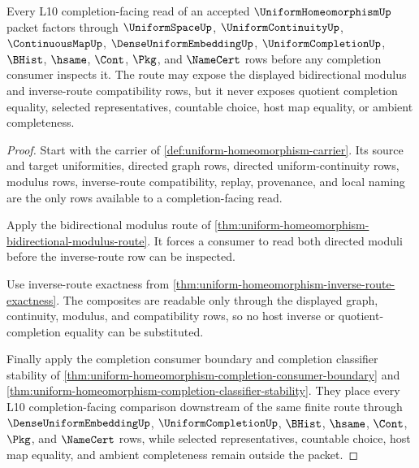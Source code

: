 \begin{theorem}
\label{thm:uniform-homeomorphism-scoped-route}
Every L10 completion-facing read of an accepted $\UniformHomeomorphismUp$ packet factors through $\UniformSpaceUp$, $\UniformContinuityUp$, $\ContinuousMapUp$, $\DenseUniformEmbeddingUp$, $\UniformCompletionUp$, $\BHist$, $\hsame$, $\Cont$, $\Pkg$, and $\NameCert$ rows before any completion consumer inspects it. The route may expose the displayed bidirectional modulus and inverse-route compatibility rows, but it never exposes quotient completion equality, selected representatives, countable choice, host map equality, or ambient completeness.
\end{theorem}
\begin{proof}
Start with the carrier of \autoref{def:uniform-homeomorphism-carrier}. Its source and target uniformities, directed graph rows, directed uniform-continuity rows, modulus rows, inverse-route compatibility, replay, provenance, and local naming are the only rows available to a completion-facing read.

Apply the bidirectional modulus route of \autoref{thm:uniform-homeomorphism-bidirectional-modulus-route}. It forces a consumer to read both directed moduli before the inverse-route row can be inspected.

Use inverse-route exactness from \autoref{thm:uniform-homeomorphism-inverse-route-exactness}. The composites are readable only through the displayed graph, continuity, modulus, and compatibility rows, so no host inverse or quotient-completion equality can be substituted.

Finally apply the completion consumer boundary and completion classifier stability of \autoref{thm:uniform-homeomorphism-completion-consumer-boundary} and \autoref{thm:uniform-homeomorphism-completion-classifier-stability}. They place every L10 completion-facing comparison downstream of the same finite route through $\DenseUniformEmbeddingUp$, $\UniformCompletionUp$, $\BHist$, $\hsame$, $\Cont$, $\Pkg$, and $\NameCert$ rows, while selected representatives, countable choice, host map equality, and ambient completeness remain outside the packet.
\end{proof}

